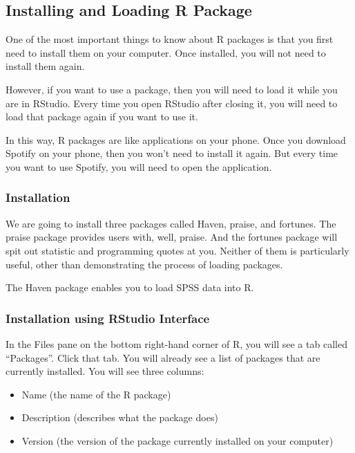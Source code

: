 \documentclass[
]{book}
\begin{document}
\hypertarget{installing-and-loading-r-package}{%
\subsection{Installing and Loading R Package}\label{installing-and-loading-r-package}}

One of the most important things to know about R packages is that you first need to install them on your computer. Once installed, you will not need to install them again.

However, if you want to use a package, then you will need to load it while you are in RStudio. Every time you open RStudio after closing it, you will need to load that package again if you want to use it.

In this way, R packages are like applications on your phone. Once you download Spotify on your phone, then you won't need to install it again. But every time you want to use Spotify, you will need to open the application.

\hypertarget{installation}{%
\subsubsection{Installation}\label{installation}}

We are going to install three packages called Haven, praise, and fortunes. The praise package provides users with, well, praise. And the fortunes package will spit out statistic and programming quotes at you. Neither of them is particularly useful, other than demonstrating the process of loading packages.

The Haven package enables you to load SPSS data into R.

\hypertarget{installation-using-rstudio-interface}{%
\subsubsection{Installation using RStudio Interface}\label{installation-using-rstudio-interface}}

In the Files pane on the bottom right-hand corner of R, you will see a tab called ``Packages''. Click that tab. You will already see a list of packages that are currently installed. You will see three columns:

\begin{itemize}
\item
  Name (the name of the R package)
\item
  Description (describes what the package does)
\item
  Version (the version of the package currently installed on your computer)
\end{itemize}
\end{document}
